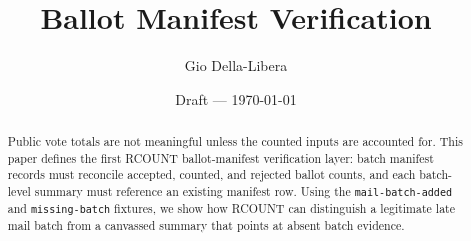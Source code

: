 \documentclass[12pt]{article}
\title{Ballot Manifest Verification}
\author{Gio Della-Libera}
\date{Draft --- \today}
\begin{document}
\maketitle

\begin{abstract}
Public vote totals are not meaningful unless the counted inputs are accounted
for. This paper defines the first RCOUNT ballot-manifest verification layer:
batch manifest records must reconcile accepted, counted, and rejected ballot
counts, and each batch-level summary must reference an existing manifest row.
Using the \texttt{mail-batch-added} and \texttt{missing-batch} fixtures, we
show how RCOUNT can distinguish a legitimate late mail batch from a canvassed
summary that points at absent batch evidence.
\end{abstract}









\nocite{rcount-overview-2026,rcount-substrate-2026,rcount-v3-2026}


\end{document}
